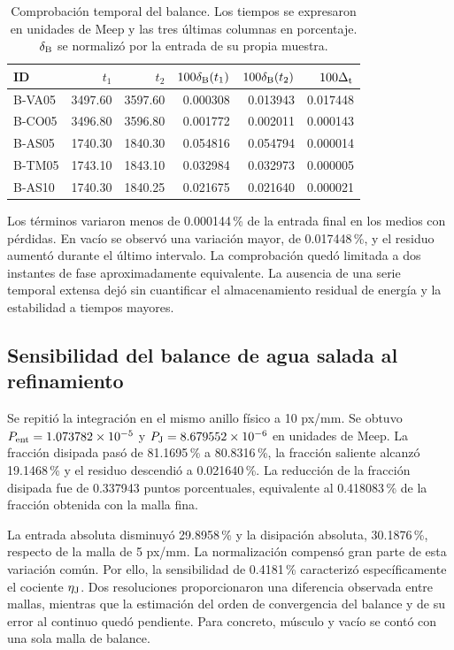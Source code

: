 \begin{table}[htbp]\centering\small
\caption{Comprobación temporal del balance. Los tiempos se expresaron en unidades de Meep y las tres últimas columnas en porcentaje. $\delta_{\rm B}$ se normalizó por la entrada de su propia muestra.}\label{tab:balance-tiempo}
\begin{tabular}{lrrrrr}\hline
ID & $t_1$ & $t_2$ & $100\delta_{\rm B}(t_1)$ & $100\delta_{\rm B}(t_2)$ & $100\Delta_{\rm t}$ \\ \hline
B-VA05 & 3497.60 & 3597.60 & 0.000308 & 0.013943 & 0.017448 \\
B-CO05 & 3496.80 & 3596.80 & 0.001772 & 0.002011 & 0.000143 \\
B-AS05 & 1740.30 & 1840.30 & 0.054816 & 0.054794 & 0.000014 \\
B-TM05 & 1743.10 & 1843.10 & 0.032984 & 0.032973 & 0.000005 \\
B-AS10 & 1740.30 & 1840.25 & 0.021675 & 0.021640 & 0.000021 \\ \hline
\end{tabular}\end{table}

Los términos variaron menos de 0.000144\,\% de la entrada final en los medios con pérdidas. En vacío se observó una variación mayor, de 0.017448\,\%, y el residuo aumentó durante el último intervalo. La comprobación quedó limitada a dos instantes de fase aproximadamente equivalente. La ausencia de una serie temporal extensa dejó sin cuantificar el almacenamiento residual de energía y la estabilidad a tiempos mayores.

\subsection{Sensibilidad del balance de agua salada al refinamiento}
Se repitió la integración en el mismo anillo físico a 10 px/mm. Se obtuvo $P_{\rm ent}=1.073782\times10^{-5}$ y $P_{\rm J}=8.679552\times10^{-6}$ en unidades de Meep. La fracción disipada pasó de 81.1695\,\% a 80.8316\,\%, la fracción saliente alcanzó 19.1468\,\% y el residuo descendió a 0.021640\,\%. La reducción de la fracción disipada fue de 0.337943 puntos porcentuales, equivalente al 0.418083\,\% de la fracción obtenida con la malla fina.

La entrada absoluta disminuyó 29.8958\,\% y la disipación absoluta, 30.1876\,\%, respecto de la malla de 5 px/mm. La normalización compensó gran parte de esta variación común. Por ello, la sensibilidad de 0.4181\,\% caracterizó específicamente el cociente $\eta_{\rm J}$. Dos resoluciones proporcionaron una diferencia observada entre mallas, mientras que la estimación del orden de convergencia del balance y de su error al continuo quedó pendiente. Para concreto, músculo y vacío se contó con una sola malla de balance.

